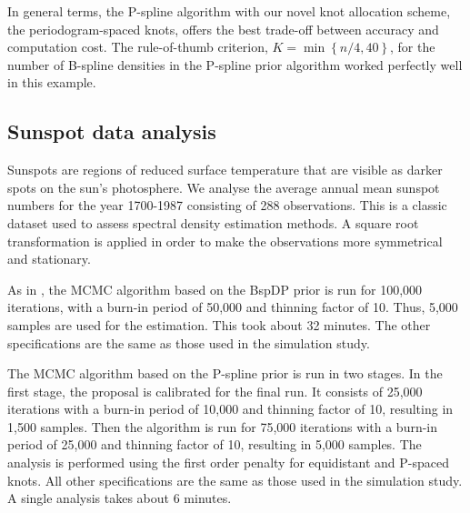 \documentclass[twocolumn,final]{svjour3}
\begin{document}
In general terms, the P-spline algorithm with our novel knot allocation scheme, the periodogram-spaced knots, offers the best trade-off between accuracy and computation cost.  The  rule-of-thumb criterion,  $K=\min\left\{n/4, 40\right\}$, for the number of B-spline densities in the P-spline prior algorithm worked perfectly well in this example. 


\subsection{Sunspot data analysis}
Sunspots are regions of reduced surface temperature that are visible as darker spots on the sun's photosphere.
We analyse the average annual mean sunspot numbers for the year 1700-1987 consisting of  288 observations.  This is a classic dataset used to assess spectral density estimation methods.  A square root transformation is applied in order to make the observations more symmetrical and stationary. 

As in \cite{Edwards2018}, the MCMC algorithm based on the BspDP prior  is run for 100,000 iterations, with a burn-in period of 50,000 and thinning factor of 10.  Thus, 5,000 samples are used for the estimation.  This took about 32 minutes.  The other specifications are the same as those used in the simulation study.

The MCMC algorithm based on the P-spline prior is run in two stages.  In  the first stage, the proposal  is calibrated for the final run.  It consists of 25,000 iterations with a burn-in period of 10,000 and thinning factor of 10, resulting in 1,500 samples.  Then the algorithm is run for 75,000 iterations with a burn-in period of 25,000 and thinning factor of 10, resulting in 5,000 samples.  The analysis is performed using the first order penalty for equidistant and P-spaced knots.   All other specifications are the same as those used in the simulation study.  A single analysis takes about 6 minutes.
\end{document}

